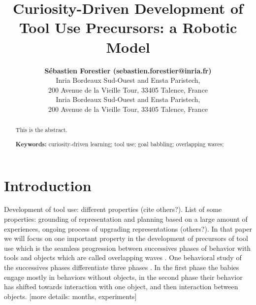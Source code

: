 \documentclass[10pt,letterpaper]{article}
\title{Curiosity-Driven Development of Tool Use Precursors: a Robotic Model}
\author{{\large \bf S\'ebastien Forestier (sebastien.forestier@inria.fr)} \\
	Inria Bordeaux Sud-Ouest and Ensta Paristech,\\
	200 Avenue de la Vieille Tour, 33405 Talence, France
  \AND {\large \bf Pierre-Yves Oudeyer (pierre-yves.oudeyer@inria.fr)} \\
	Inria Bordeaux Sud-Ouest and Ensta Paristech,\\
	200 Avenue de la Vieille Tour, 33405 Talence, France}
\begin{document}
\maketitle


\begin{abstract}
This is the abstract.

\textbf{Keywords:} 
curiosity-driven learning; tool use; goal babbling; overlapping waves; 
\end{abstract}


\section{Introduction}

	Development of tool use: different properties \cite{guerin2013survey} (cite others?). 
	List of some properties: grounding of representation and planning based on a large amount of experiences, ongoing process of upgrading representations (others?).
	In that paper we will focus on one important property in the development of precursors of tool use which is the seamless progression 
	between successives phases of behavior with tools and objects which are called overlapping waves \cite{siegler1996emerging}. 
	One behavioral study of the successives phases differentiate three phases \cite{guerin2013survey}.
	In the first phase the babies engage mostly in behaviors without objects, in the second phase their behavior has shifted towards interaction with one object, and then interaction between objects.
	[more details: months, experiments]
	
\end{document}
